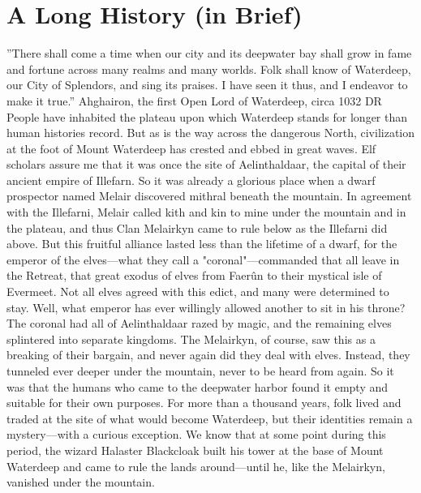 \documentclass[10pt,a4paper,twoside,twocolumn,openany,nodeprecatedcode]{dndbook}
\begin{document}
\section{A Long History (in Brief)}
\DndQuote%
{}
{''There shall come a time when our city and its deepwater bay shall grow in fame and fortune across many realms and many worlds. Folk shall know of Waterdeep, our City of Splendors, and sing its praises. I have seen it thus, and I endeavor to make it true.''}
{Ahghairon, the first Open Lord of Waterdeep, circa 1032 DR}
People have inhabited the plateau upon which Waterdeep stands for longer than human histories record. But as is the way across the dangerous North, civilization at the foot of Mount Waterdeep has crested and ebbed in great waves. Elf scholars assure me that it was once the site of Aelinthaldaar, the capital of their ancient empire of Illefarn. So it was already a glorious place when a dwarf prospector named Melair discovered mithral beneath the mountain. In agreement with the Illefarni, Melair called kith and kin to mine under the mountain and in the plateau, and thus Clan Melairkyn came to rule below as the Illefarni did above.
But this fruitful alliance lasted less than the lifetime of a dwarf, for the emperor of the elves—what they call a "coronal"—commanded that all leave in the Retreat, that great exodus of elves from Faerûn to their mystical isle of Evermeet. Not all elves agreed with this edict, and many were determined to stay. Well, what emperor has ever willingly allowed another to sit in his throne? The coronal had all of Aelinthaldaar razed by magic, and the remaining elves splintered into separate kingdoms. The Melairkyn, of course, saw this as a breaking of their bargain, and never again did they deal with elves. Instead, they tunneled ever deeper under the mountain, never to be heard from again.
So it was that the humans who came to the deepwater harbor found it empty and suitable for their own purposes. For more than a thousand years, folk lived and traded at the site of what would become Waterdeep, but their identities remain a mystery—with a curious exception. We know that at some point during this period, the wizard Halaster Blackcloak built his tower at the base of Mount Waterdeep and came to rule the lands around—until he, like the Melairkyn, vanished under the mountain.
\end{document}
